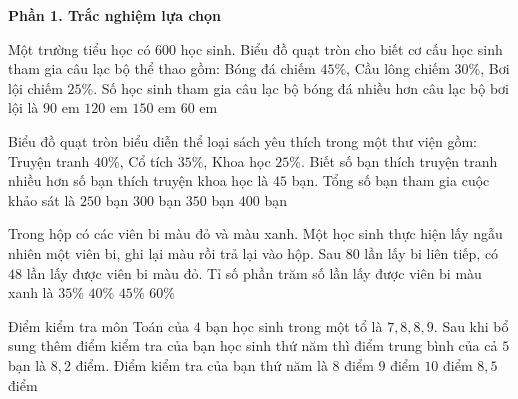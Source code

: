 \textbf{Phần 1. Trắc nghiệm lựa chọn}

\begin{ex} %
Một trường tiểu học có $600$ học sinh. Biểu đồ quạt tròn cho biết cơ cấu học sinh tham gia câu lạc bộ thể thao gồm: Bóng đá chiếm $45\%$, Cầu lông chiếm $30\%$, Bơi lội chiếm $25\%$. Số học sinh tham gia câu lạc bộ bóng đá nhiều hơn câu lạc bộ bơi lội là
\choice
{$90$ em}
{\True $120$ em}
{$150$ em}
{$60$ em}
\end{ex}

\begin{ex} %
Biểu đồ quạt tròn biểu diễn thể loại sách yêu thích trong một thư viện gồm: Truyện tranh $40\%$, Cổ tích $35\%$, Khoa học $25\%$. Biết số bạn thích truyện tranh nhiều hơn số bạn thích truyện khoa học là $45$ bạn. Tổng số bạn tham gia cuộc khảo sát là
\choice
{$250$ bạn}
{\True $300$ bạn}
{$350$ bạn}
{$400$ bạn}
\end{ex}

\begin{ex} %
Trong hộp có các viên bi màu đỏ và màu xanh. Một học sinh thực hiện lấy ngẫu nhiên một viên bi, ghi lại màu rồi trả lại vào hộp. Sau $80$ lần lấy bi liên tiếp, có $48$ lần lấy được viên bi màu đỏ. Tỉ số phần trăm số lần lấy được viên bi màu xanh là
\choice
{$35\%$}
{\True $40\%$}
{$45\%$}
{$60\%$}
\end{ex}

\begin{ex} %
Điểm kiểm tra môn Toán của $4$ bạn học sinh trong một tổ là $7, 8, 8, 9$. Sau khi bổ sung thêm điểm kiểm tra của bạn học sinh thứ năm thì điểm trung bình của cả $5$ bạn là $8{,}2$ điểm. Điểm kiểm tra của bạn thứ năm là
\choice
{$8$ điểm}
{\True $9$ điểm}
{$10$ điểm}
{$8{,}5$ điểm}
\end{ex}

